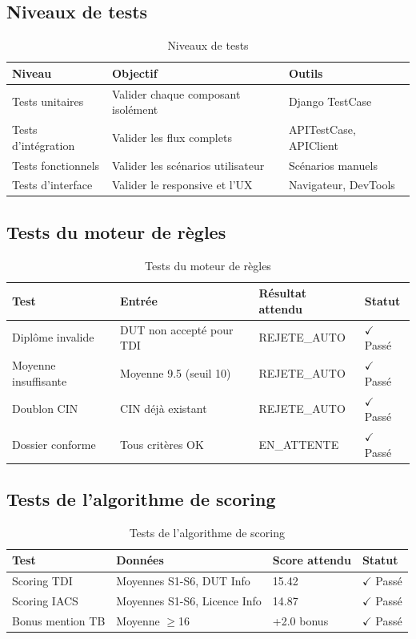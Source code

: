 \subsection{Niveaux de tests}
\begin{table}[htbp]
\centering
\caption{Niveaux de tests}
\label{tab:niveaux-tests}
\begin{tabular}{p{3.5cm} p{7cm} p{4cm}}
\toprule
\textbf{Niveau} & \textbf{Objectif} & \textbf{Outils} \\
\midrule
Tests unitaires & Valider chaque composant isolément & Django TestCase \\
Tests d'intégration & Valider les flux complets & APITestCase, APIClient \\
Tests fonctionnels & Valider les scénarios utilisateur & Scénarios manuels \\
Tests d'interface & Valider le responsive et l'UX & Navigateur, DevTools \\
\bottomrule
\end{tabular}
\end{table}

\subsection{Tests du moteur de règles}
\begin{table}[htbp]
\centering
\caption{Tests du moteur de règles}
\label{tab:tests-regles}
\begin{tabular}{p{3.5cm} p{4.5cm} p{3.5cm} p{2.5cm}}
\toprule
\textbf{Test} & \textbf{Entrée} & \textbf{Résultat attendu} & \textbf{Statut} \\
\midrule
Diplôme invalide & DUT non accepté pour TDI & REJETE\_AUTO & $\checkmark$ Passé \\
Moyenne insuffisante & Moyenne 9.5 (seuil 10) & REJETE\_AUTO & $\checkmark$ Passé \\
Doublon CIN & CIN déjà existant & REJETE\_AUTO & $\checkmark$ Passé \\
Dossier conforme & Tous critères OK & EN\_ATTENTE & $\checkmark$ Passé \\
\bottomrule
\end{tabular}
\end{table}

\subsection{Tests de l'algorithme de scoring}
\begin{table}[htbp]
\centering
\caption{Tests de l'algorithme de scoring}
\label{tab:tests-scoring}
\begin{tabular}{p{3.5cm} p{4.5cm} p{3cm} p{2.5cm}}
\toprule
\textbf{Test} & \textbf{Données} & \textbf{Score attendu} & \textbf{Statut} \\
\midrule
Scoring TDI & Moyennes S1-S6, DUT Info & 15.42 & $\checkmark$ Passé \\
Scoring IACS & Moyennes S1-S6, Licence Info & 14.87 & $\checkmark$ Passé \\
Bonus mention TB & Moyenne $\geq$16 & +2.0 bonus & $\checkmark$ Passé \\
\bottomrule
\end{tabular}
\end{table}

